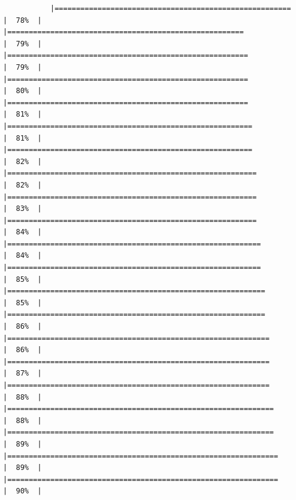 \documentclass[
]{article}
\begin{document}
\begin{verbatim}
           |=======================================================               |  78%  |                                                                              |=======================================================               |  79%  |                                                                              |========================================================              |  79%  |                                                                              |========================================================              |  80%  |                                                                              |========================================================              |  81%  |                                                                              |=========================================================             |  81%  |                                                                              |=========================================================             |  82%  |                                                                              |==========================================================            |  82%  |                                                                              |==========================================================            |  83%  |                                                                              |==========================================================            |  84%  |                                                                              |===========================================================           |  84%  |                                                                              |===========================================================           |  85%  |                                                                              |============================================================          |  85%  |                                                                              |============================================================          |  86%  |                                                                              |=============================================================         |  86%  |                                                                              |=============================================================         |  87%  |                                                                              |=============================================================         |  88%  |                                                                              |==============================================================        |  88%  |                                                                              |==============================================================        |  89%  |                                                                              |===============================================================       |  89%  |                                                                              |===============================================================       |  90%  |                                                                    
\end{verbatim}
\end{document}
